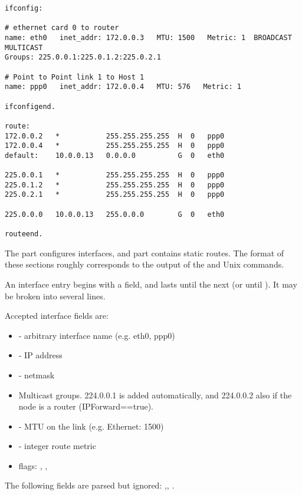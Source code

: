 \begin{verbatim}
ifconfig:

# ethernet card 0 to router
name: eth0   inet_addr: 172.0.0.3   MTU: 1500   Metric: 1  BROADCAST MULTICAST
Groups: 225.0.0.1:225.0.1.2:225.0.2.1

# Point to Point link 1 to Host 1
name: ppp0   inet_addr: 172.0.0.4   MTU: 576   Metric: 1

ifconfigend.

route:
172.0.0.2   *           255.255.255.255  H  0   ppp0
172.0.0.4   *           255.255.255.255  H  0   ppp0
default:    10.0.0.13   0.0.0.0          G  0   eth0

225.0.0.1   *           255.255.255.255  H  0   ppp0
225.0.1.2   *           255.255.255.255  H  0   ppp0
225.0.2.1   *           255.255.255.255  H  0   ppp0

225.0.0.0   10.0.0.13   255.0.0.0        G  0   eth0

routeend.
\end{verbatim}

The  part configures interfaces,
and  part contains static routes.
The format of these sections roughly corresponds to the output
of the  and  Unix commands.

An interface entry begins with a  field, and lasts until
the next  (or until ). It may
be broken into several lines.

Accepted interface fields are:

\begin{itemize}
  \item {} - arbitrary interface name (e.g. eth0, ppp0)
  \item {} - IP address
  \item {} - netmask
  \item {} Multicast groups. 224.0.0.1 is added automatically,
     and 224.0.0.2 also if the node is a router (IPForward==true).
  \item {} - MTU on the link (e.g. Ethernet: 1500)
  \item {} - integer route metric
  \item flags: , , 
\end{itemize}

The following fields are parsed but ignored: ,,
.


